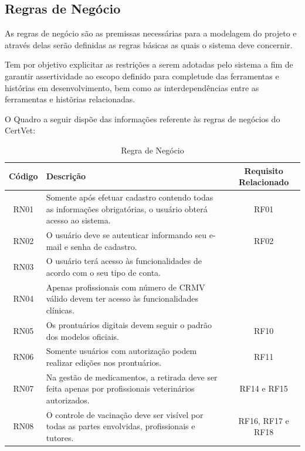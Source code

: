 \documentclass[
    12pt,               %
    openright,          %
    oneside,
    a4paper,            %
    BIBLATEX,           %
    TODO,               %
    english,            %
    brazil              %
    ]{ifsp-spo-inf-ctds}
\begin{document}
        \subsection{Regras de Negócio}
        
            As regras de negócio são as premissas necessárias para a modelagem do projeto e através delas serão definidas as regras básicas as quais o sistema deve concernir.
            
            Tem por objetivo explicitar as restrições a serem adotadas pelo sistema a fim de garantir assertividade ao escopo definido para completude das ferramentas e histórias em desenvolvimento, bem como as interdependências entre as ferramentas e histõrias relacionadas.
            
            O Quadro a seguir dispõe das informações referente às regras de negócios do CertVet:

            \begin{center}
                \begin{table}[H]
                \begin{tabulary}{1.0\textwidth}{|C|p{23em}|C|}
                \hline
                 Código & Descrição & Requisito Relacionado\\
                \hline
                RN01 & Somente após efetuar cadastro contendo todas as informações obrigatórias, o usuário obterá acesso ao sistema. & RF01\\
                \hline
                RN02 & O usuário deve se autenticar informando seu e-mail e senha de cadastro. & RF02\\
                \hline
                RN03 & O usuário terá acesso às funcionalidades de acordo com o seu tipo de conta. & \\
                \hline
                RN04 & Apenas profissionais com número de CRMV válido devem ter acesso às funcionalidades clínicas. & \\
                \hline
                RN05 & Os prontuários digitais devem seguir o padrão dos modelos oficiais. & RF10\\
                \hline
                RN06 & Somente usuários com autorização podem realizar edições nos prontuários. & RF11\\
                \hline
                RN07 & Na gestão de medicamentos, a retirada deve ser feita apenas por profissionais veterinários autorizados. & RF14 e RF15\\
                \hline
                RN08 & O controle de vacinação deve ser visível por todas as partes envolvidas, profissionais e tutores. & RF16, RF17 e RF18\\
                \hline
                \end{tabulary}   \caption{Regra de Negócio}
                \label{tab:regra}
                \end{table}
            \end{center}
\end{document}
